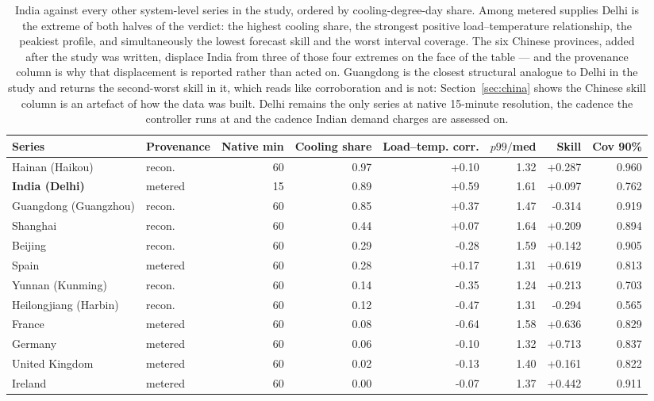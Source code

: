 \begin{table}[t]
\centering
\scriptsize
\setlength{\tabcolsep}{3pt}
\begin{tabular}{llrrrrrr}
\toprule
Series & Provenance & Native min & Cooling share & Load--temp. corr. & $p99/$med & Skill & Cov 90\% \\
\midrule
Hainan (Haikou) & recon. & 60 & 0.97 & +0.10 & 1.32 & +0.287 & 0.960 \\
\textbf{India (Delhi)} & metered & 15 & 0.89 & +0.59 & 1.61 & +0.097 & 0.762 \\
Guangdong (Guangzhou) & recon. & 60 & 0.85 & +0.37 & 1.47 & -0.314 & 0.919 \\
Shanghai & recon. & 60 & 0.44 & +0.07 & 1.64 & +0.209 & 0.894 \\
Beijing & recon. & 60 & 0.29 & -0.28 & 1.59 & +0.142 & 0.905 \\
Spain & metered & 60 & 0.28 & +0.17 & 1.31 & +0.619 & 0.813 \\
Yunnan (Kunming) & recon. & 60 & 0.14 & -0.35 & 1.24 & +0.213 & 0.703 \\
Heilongjiang (Harbin) & recon. & 60 & 0.12 & -0.47 & 1.31 & -0.294 & 0.565 \\
France & metered & 60 & 0.08 & -0.64 & 1.58 & +0.636 & 0.829 \\
Germany & metered & 60 & 0.06 & -0.10 & 1.32 & +0.713 & 0.837 \\
United Kingdom & metered & 60 & 0.02 & -0.13 & 1.40 & +0.161 & 0.822 \\
Ireland & metered & 60 & 0.00 & -0.07 & 1.37 & +0.442 & 0.911 \\
\bottomrule
\end{tabular}
\caption{India against every other system-level series in the study, ordered by cooling-degree-day share. Among metered supplies Delhi is the extreme of both halves of the verdict: the highest cooling share, the strongest positive load--temperature relationship, the peakiest profile, and simultaneously the lowest forecast skill and the worst interval coverage. The six Chinese provinces, added after the study was written, displace India from three of those four extremes on the face of the table --- and the provenance column is why that displacement is reported rather than acted on. Guangdong is the closest structural analogue to Delhi in the study and returns the second-worst skill in it, which reads like corroboration and is not: Section~\ref{sec:china} shows the Chinese skill column is an artefact of how the data was built. Delhi remains the only series at native 15-minute resolution, the cadence the controller runs at and the cadence Indian demand charges are assessed on.}
\label{tab:india}
\end{table}
